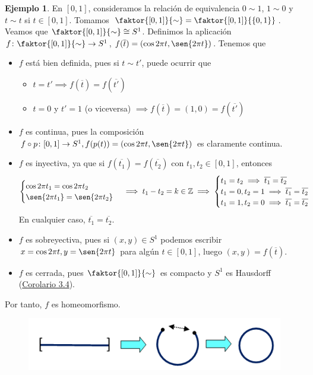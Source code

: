 \documentclass[12pt]{report}
\theoremstyle{definition}
\theoremstyle{definition}
\newtheorem{example}{Ejemplo}[chapter]
\theoremstyle{remark}
\newcommand{\Z}{\mathbb Z}
\begin{document}
\begin{example}
En $[0,1]$, consideramos la relación de equivalencia $0 \sim 1$, $1 \sim 0$ y $t \sim t$ si $t \in [0,1]$. Tomamos $\faktor{[0,1]}{\sim} = \faktor{[0,1]}{\{0,1\}}$. Veamos que $\faktor{[0,1]}{\sim} \cong S^1$. Definimos la aplicación $f \colon \faktor{[0,1]}{\sim} \to S^1$, $f(\overline{t}) = (\cos{2 \pi t}, \sen{2 \pi t})$. Tenemos que

\begin{itemize}
    \item $f$ está bien definida, pues si $t \sim t'$, puede ocurrir que
    \begin{itemize}
        \item $t = t' \implies f(\overline{t}) = f(\overline{t'})$
        \item $t = 0$ y $t' = 1$ (o viceversa) $\implies f(\overline{t}) = (1,0) = f(\overline{t'})$
    \end{itemize}
    \item $f$ es continua, pues la composición $f \circ p \colon [0,1] \to S^1, f(p(t)) = (\cos{2 \pi t}, \sen{2 \pi t})$ es claramente continua.
    \item $f$ es inyectiva, ya que si $f(\overline{t_1}) = f(\overline{t_2})$ con $t_1, t_2 \in [0,1]$, entonces
    \[
    \begin{cases}
        \cos{2 \pi t_1} = \cos{2 \pi t_2} \\
        \sen{2 \pi t_1} = \sen{2 \pi t_2}
    \end{cases} \implies t_1 - t_2 = k \in \Z \implies 
    \begin{cases}
        t_1 = t_2 \implies \overline{t_1} = \overline{t_2} \\
        t_1 = 0, t_2 = 1 \implies \overline{t_1} = \overline{t_2} \\
        t_1 = 1, t_2 = 0 \implies \overline{t_1} = \overline{t_2}
    \end{cases}
    \]
    En cualquier caso, $\overline{t_1} = \overline{t_2}$.
    \item $f$ es sobreyectiva, pues si $(x,y) \in S^1$ podemos escribir $x = \cos{2 \pi t}, y = \sen{2 \pi t}$ para algún $t \in [0,1]$, luego $(x,y) = f(\overline{t})$.
    \item $f$ es cerrada, pues $\faktor{[0,1]}{\sim}$ es compacto y $S^1$ es Hausdorff (\hyperref[cor3.4.]{\color{blue}Corolario 3.4}).
\end{itemize}

Por tanto, $f$ es homeomorfismo.

\begin{figure}[h]
\includegraphics[scale = 0.7]{ex1.26}
\centering
\end{figure}

\end{example}
\end{document}
